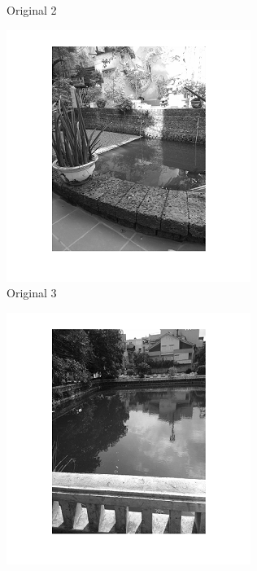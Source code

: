 \begin{center}
\begin{figure}[h]
\begin{subfigure}[b]{0.18\textwidth}
                \caption{Original 2}
                \label{fig:original 2}
        \end{subfigure}%
        \begin{subfigure}[b]{0.18\textwidth}
                \includegraphics[width=\linewidth]{pond3.png}
                 \caption{Original 3}
                  \label{fig:original 3}
        \end{subfigure}%
        \begin{subfigure}[b]{0.18\textwidth}
                \includegraphics[width=\linewidth]{pond4.png}

\end{subfigure}
\end{figure}
\end{center}
